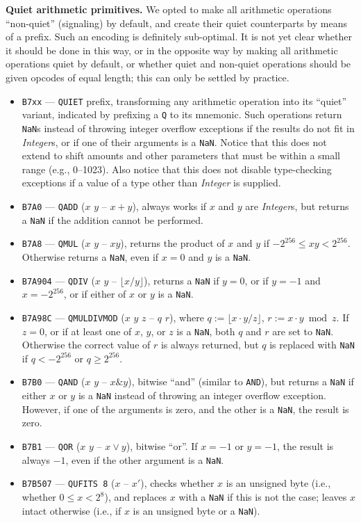 \documentclass[12pt,oneside]{article}
\def\makepoint#1{\medbreak\noindent{\bf #1.\ }}
\def\nxsubpoint{\refstepcounter{subsubsection}%
  \smallbreak\makepoint{\thesubsubsection}}
\def\emb#1{\textbf{#1.}}
\begin{document}
\nxsubpoint\emb{Quiet arithmetic primitives}
We opted to make all arithmetic operations ``non-quiet'' (signaling) by default, and create their quiet counterparts by means of a prefix. Such an encoding is definitely sub-optimal. It is not yet clear whether it should be done in this way, or in the opposite way by making all arithmetic operations quiet by default, or whether quiet and non-quiet operations should be given opcodes of equal length; this can only be settled by practice.
\begin{itemize}
\item {\tt B7xx} --- {\tt QUIET} prefix, transforming any arithmetic operation into its ``quiet'' variant, indicated by prefixing a {\tt Q} to its mnemonic. Such operations return {\tt NaN}s instead of throwing integer overflow exceptions if the results do not fit in {\it Integer\/}s, or if one of their arguments is a {\tt NaN}. Notice that this does not extend to shift amounts and other parameters that must be within a small range (e.g., 0--1023). Also notice that this does not disable type-checking exceptions if a value of a type other than {\it Integer\/} is supplied.
\item {\tt B7A0} --- {\tt QADD} ($x$ $y$ -- $x+y$), always works if $x$ and $y$ are {\it Integer\/}s, but returns a {\tt NaN} if the addition cannot be performed.
\item {\tt B7A8} --- {\tt QMUL} ($x$ $y$ -- $xy$), returns the product of $x$ and $y$ if $-2^{256}\leq xy<2^{256}$. Otherwise returns a {\tt NaN}, even if $x=0$ and $y$ is a {\tt NaN}.
\item {\tt B7A904} --- {\tt QDIV} ($x$ $y$ -- $\lfloor x/y\rfloor$), returns a {\tt NaN} if $y=0$, or if $y=-1$ and $x=-2^{256}$, or if either of $x$ or $y$ is a {\tt NaN}.
\item {\tt B7A98C} --- {\tt QMULDIVMOD} ($x$ $y$ $z$ -- $q$ $r$), where $q:=\lfloor x\cdot y/z\rfloor$, $r:=x\cdot y\bmod z$. If $z=0$, or if at least one of $x$, $y$, or $z$ is a {\tt NaN}, both $q$ and $r$ are set to {\tt NaN}. Otherwise the correct value of $r$ is always returned, but $q$ is replaced with {\tt NaN} if $q<-2^{256}$ or $q\geq2^{256}$.
\item {\tt B7B0} --- {\tt QAND} ($x$ $y$ -- $x\&y$), bitwise ``and'' (similar to {\tt AND}), but returns a {\tt NaN} if either $x$ or $y$ is a {\tt NaN} instead of throwing an integer overflow exception. However, if one of the arguments is zero, and the other is a {\tt NaN}, the result is zero.
\item {\tt B7B1} --- {\tt QOR} ($x$ $y$ -- $x\vee y$), bitwise ``or''. If $x=-1$ or $y=-1$, the result is always $-1$, even if the other argument is a {\tt NaN}.
\item {\tt B7B507} --- {\tt QUFITS 8} ($x$ -- $x'$), checks whether $x$ is an unsigned byte (i.e., whether $0\leq x<2^8$), and replaces $x$ with a {\tt NaN} if this is not the case; leaves $x$ intact otherwise (i.e., if $x$ is an unsigned byte or a {\tt NaN}).
\end{itemize}
\end{document}

